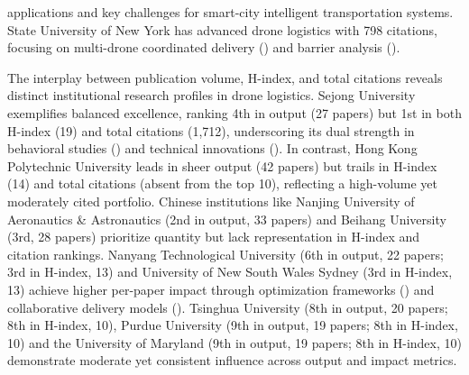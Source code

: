 \documentclass{article}
\begin{document}
applications and key challenges for smart-city intelligent transportation systems. State University of New York has advanced drone logistics with 798 citations, focusing on multi-drone coordinated delivery (\cite{WOS:000509790500020}) and barrier analysis (\cite{WOS:000547773000001}).

The interplay between publication volume, H-index, and total citations reveals distinct institutional research profiles in drone logistics. Sejong University exemplifies balanced excellence, ranking 4th in output (27 papers) but 1st in both H-index (19) and total citations (1,712), underscoring its dual strength in behavioral studies (\cite{WOS:000478712400012}) and technical innovations (\cite{WOS:000538038400010}). In contrast, Hong Kong Polytechnic University leads in sheer output (42 papers) but trails in H-index (14) and total citations (absent from the top 10), reflecting a high-volume yet moderately cited portfolio. Chinese institutions like Nanjing University of Aeronautics \& Astronautics (2nd in output, 33 papers) and Beihang University (3rd, 28 papers) prioritize quantity but lack representation in H-index and citation rankings. Nanyang Technological University (6th in output, 22 papers; 3rd in H-index, 13) and University of New South Wales Sydney (3rd in H-index, 13) achieve higher per-paper impact through optimization frameworks (\cite{WOS:000501349900060}) and collaborative delivery models (\cite{WOS:000467564700204}). Tsinghua University (8th in output, 20 papers; 8th in H-index, 10), Purdue University (9th in output, 19 papers; 8th in H-index, 10) and the University of Maryland (9th in output, 19 papers; 8th in H-index, 10) demonstrate moderate yet consistent influence across output and impact metrics.
\end{document}
